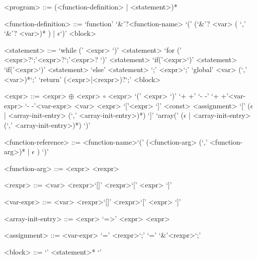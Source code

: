 \begin{grammar}
<program> ::= (<function-definition> | <statement>)*
\end{grammar}
\begin{grammar}
<function-definition> ::= `function' `&'?<function-name> `(' (`&'? <var> ( `,' `&'? <var>)* ) | $\epsilon$`)' <block>
\end{grammar}
\begin{grammar}
<statement> ::= `while (' <expr> `)' <statement>
\alt `for (' <expr>?`;'<expr>?`;'<expr>? `)' <statement>
\alt `if('<expr>`)' <statement>
\alt `if('<expr>`)' <statement> `else' <statement>
\alt `;'
\alt <expr>`;'
\alt `global' <var> (`,' <var>)*`;'
\alt `return' (<expr>|<rexpr>)?`;'
\alt <block>
\end{grammar}
\begin{grammar}
<expr> ::= <expr> $\oplus$ <expr>
\alt $\circ$ <expr>
\alt `(' <expr> `)'
`+ +'
`- -'
\alt `+ +'<var-expr>
\alt `- -'<var-expr>
\alt <var>
\alt <expr> `['<expr> `]'
\alt <const>
\alt <assignment>
\alt `[' ($\epsilon$ | <array-init-entry> (`,' <array-init-entry>)*) `]'
\alt `array(' ($\epsilon$ | <array-init-entry> (`,' <array-init-entry>)*) `)'
\end{grammar}
\begin{grammar}
<function-reference> ::= <function-name>`(' (<function-arg> (`,' <function-arg>)* | $\epsilon$ ) `)'
\end{grammar}
\begin{grammar}
<function-arg> ::= <expr> 
\alt <rexpr> 
\end{grammar}
\begin{grammar}
<rexpr> ::= <var> 
\alt <rexpr>`[]'
\alt <rexpr>`[' <expr> `]'
\end{grammar}
\begin{grammar}
<var-expr> ::= <var> 
\alt <rexpr>`[]'
\alt <rexpr>`[' <expr> `]'
\end{grammar}
\begin{grammar}
<array-init-entry> ::= <expr> `=>' <expr> 
\alt <expr>
\end{grammar}
\begin{grammar}
<assignment> ::= <var-expr> `=' <rexpr>`;'
 `=' `&'<rexpr>`;'
\end{grammar}

\begin{grammar}
<block> ::= `{' <statement>* `}'
\end{grammar}